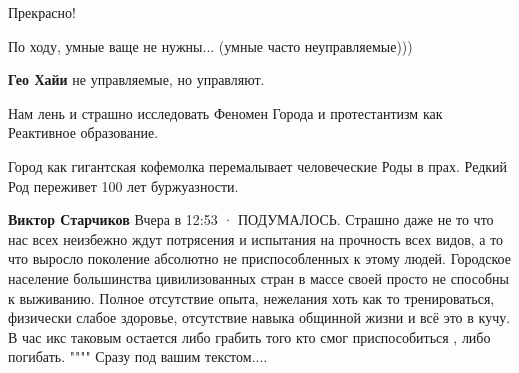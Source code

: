 \begin{itemize}
 
Прекрасно!

 
По ходу, умные ваще не нужны...
(умные часто неуправляемые)))

\begin{itemize}
 
\textbf{Гео Хайи} не управляемые, но управляют.
\end{itemize}

 
Нам лень и страшно исследовать Феномен Города и протестантизм как Реактивное
образование.

\begin{itemize}
 
Город как гигантская кофемолка перемалывает человеческие Роды в прах. Редкий Род переживет 100 лет буржуазности.
\end{itemize}

 
\textbf{Виктор Старчиков}
Вчера в 12:53 ·
ПОДУМАЛОСЬ.
Страшно даже не то что нас всех неизбежно ждут потрясения и испытания на прочность всех видов, а то что выросло поколение абсолютно не приспособленных к этому людей.
Городское население большинства цивилизованных стран в массе своей просто не способны к выживанию.
Полное отсутствие опыта, нежелания хоть как то тренироваться, физически слабое здоровье, отсутствие навыка общинной жизни и всё это в кучу.
В час икс таковым остается либо грабить того кто смог приспособиться , либо погибать. """" Сразу под вашим текстом....


\end{itemize}
